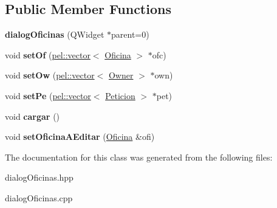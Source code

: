 \subsection*{Public Member Functions}
\begin{DoxyCompactItemize}
\item 
\hypertarget{classdialogOficinas_a38eadc87eb5381d6447af6b54d73bf53}{}{\bfseries dialog\+Oficinas} (Q\+Widget $\ast$parent=0)\label{classdialogOficinas_a38eadc87eb5381d6447af6b54d73bf53}

\item 
\hypertarget{classdialogOficinas_abe9f02cd44d4238b7b68ebd5b029a507}{}void {\bfseries set\+Of} (\hyperlink{classpel_1_1vector}{pel\+::vector}$<$ \hyperlink{classOficina}{Oficina} $>$ $\ast$ofc)\label{classdialogOficinas_abe9f02cd44d4238b7b68ebd5b029a507}

\item 
\hypertarget{classdialogOficinas_a7b129b6519609a19d98dba1353eb4356}{}void {\bfseries set\+Ow} (\hyperlink{classpel_1_1vector}{pel\+::vector}$<$ \hyperlink{classOwner}{Owner} $>$ $\ast$own)\label{classdialogOficinas_a7b129b6519609a19d98dba1353eb4356}

\item 
\hypertarget{classdialogOficinas_af8d8a489575cb71d83c36c6667471aa7}{}void {\bfseries set\+Pe} (\hyperlink{classpel_1_1vector}{pel\+::vector}$<$ \hyperlink{classPeticion}{Peticion} $>$ $\ast$pet)\label{classdialogOficinas_af8d8a489575cb71d83c36c6667471aa7}

\item 
\hypertarget{classdialogOficinas_ad22074f104581639754c4eb1703e1da4}{}void {\bfseries cargar} ()\label{classdialogOficinas_ad22074f104581639754c4eb1703e1da4}

\item 
\hypertarget{classdialogOficinas_a616cff0912d89a0c0f5a54078353c8eb}{}void {\bfseries set\+Oficina\+A\+Editar} (\hyperlink{classOficina}{Oficina} \&ofi)\label{classdialogOficinas_a616cff0912d89a0c0f5a54078353c8eb}

\end{DoxyCompactItemize}


The documentation for this class was generated from the following files\+:\begin{DoxyCompactItemize}
\item 
dialog\+Oficinas.\+hpp\item 
dialog\+Oficinas.\+cpp\end{DoxyCompactItemize}

